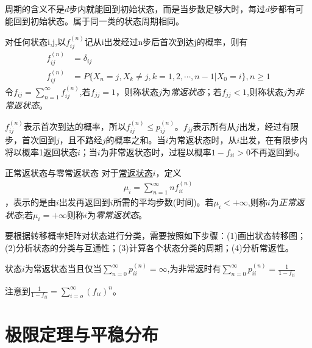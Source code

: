 周期的含义不是\(d\)步内就能回到初始状态，而是当步数足够大时，每过\(d\)步都有可能回到初始状态。属于同一类的状态周期相同。

\begin{definition}\label{def:ConRet}
	对任何状态i,j,以\(f_{ij}^{(n)}\)记从i出发经过n步后首次到达j的概率，则有
	\begin{align*}
		f_{ij}^{(n)} & =\delta_{ij}                                              \\
		f_{ij}^{(n)} & =P\{X_n=j,X_k\neq j,k=1,2,\cdots,n-1|X_0=i\},n\geqslant 1
	\end{align*}
	令\(f_{ij}=\sum_{n=1}^{\infty}f_{ij}^{(n)}\),若\(f_{jj}=1\)，则称状态\(j\)为\emph{常返状态}；若\(f_{jj}<1\),则称状态\(j\)为\emph{非常返状态}。
\end{definition}

\(f_{ij}^{(n)}\)表示首次到达的概率，所以\(f_{ij}^{(n)}\leqslant p_{ij}^{(n)}\)。\(f_{jj}\)表示所有从\(j\)出发，经过有限步，首次回到\(j\)，且不路经\(j\)的概率之和。当\(i\)为常返状态时，从\(i\)出发，在有限步内将以概率1返回状态\(i\)；当\(i\)为非常返状态时，过程以概率\(1-f_{ii}>0\)不再返回到\(i\)。

\begin{definition}\label{def:numret}{正常返状态与零常返状态}
	对于\underline{常返状态\(i\)}，定义
	\begin{align*}
		\mu_i=\sum_{n=1}^{\infty}nf_{ii}^{(n)}
	\end{align*}
	，表示的是由\(i\)出发再返回到\(i\)所需的平均步数(时间)。若\(\mu_i<+\infty\),则称\(i\)为\emph{正常返状态};若\(\mu_i=+\infty\)则称\(i\)为\emph{零常返状态}。
\end{definition}

要根据转移概率矩阵对状态进行分类，需要按照如下步骤：(1)画出状态转移图；(2)分析状态的分类与互通性；(3)计算各个状态分类的周期；(4)分析常返性。

\begin{theorem}\label{prop:unconretproptran}
	状态\(i\)为常返状态当且仅当\(\sum_{n=0}^{\infty}p_{ii}^{(n)}=\infty\),为非常返时有\(\sum_{n=0}^{\infty}p_{ii}^{(n)}=\frac{1}{1-f_{ii}}\)
\end{theorem}

注意到\(\frac{1}{1-f_{ii}}=\sum_{i=o}^{\infty}(f_{ii})^n\)。

\section{极限定理与平稳分布}

